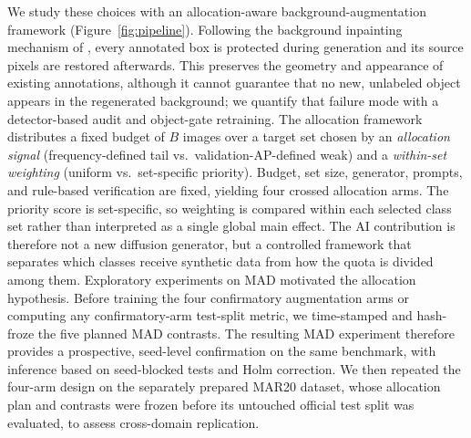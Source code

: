 \documentclass[preprint,12pt,authoryear]{elsarticle}
\begin{document}
We study these choices with an allocation-aware background-augmentation
framework (Figure~\ref{fig:pipeline}). Following the background
inpainting mechanism of \citet{li2024background}, every annotated box is
protected during generation and its source pixels are restored
afterwards. This preserves the geometry and appearance of existing
annotations, although it cannot guarantee that no new, unlabeled object
appears in the regenerated background; we quantify that failure mode
with a detector-based audit and object-gate retraining. The allocation
framework distributes a fixed budget of $B$ images over a target set
chosen by an \emph{allocation signal} (frequency-defined tail vs.\
validation-AP-defined weak) and a \emph{within-set weighting} (uniform
vs.\ set-specific priority). Budget, set size, generator, prompts, and
rule-based verification are fixed, yielding four crossed allocation
arms. The priority score is set-specific, so weighting is compared
within each selected class set rather than interpreted as a single
global main effect. The AI contribution is therefore not a new
diffusion generator, but a controlled framework that separates which
classes receive synthetic data from how the quota is divided among them.
Exploratory experiments on MAD motivated the allocation hypothesis.
Before training the four confirmatory augmentation arms or computing any
confirmatory-arm test-split metric, we time-stamped and hash-froze the
five planned MAD contrasts. The resulting MAD experiment therefore
provides a prospective, seed-level confirmation on the same benchmark,
with inference based on seed-blocked tests and Holm correction. We then
repeated the four-arm design on the separately prepared MAR20 dataset,
whose allocation plan and contrasts were frozen before its untouched
official test split was evaluated, to assess cross-domain replication.
\end{document}
